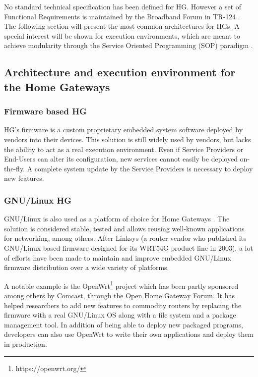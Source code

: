  
No standard technical specification has been defined for HG. However a set of Functional Requirements is maintained by the Broadband Forum in TR-124 \cite{broadband_forum_functional_2014}.
The following section will present the most common architectures for HGs.
A special interest will be shown for execution environments, which are meant to achieve modularity through the Service Oriented Programming (SOP) paradigm \cite{bieber2001introduction}.


\subsection{Architecture and execution environment for the Home Gateways}

\subsubsection{Firmware based HG}
HG's firmware is a custom proprietary embedded system software deployed by vendors into their devices.
This solution is still widely used by vendors, but lacks the ability to act as a real execution environment.
Even if Service Providers or End-Users can alter its configuration, new services cannot easily be deployed on-the-fly.
A complete system update by the Service Providers is necessary to deploy new features.
   
\subsubsection{GNU/Linux HG}
   
GNU/Linux is also used as a platform of choice for Home Gateways \cite{royon_multiservice_2007}.
The solution is considered stable, tested and allows reusing well-known applications for networking, among others.
After Linksys (a router vendor who published its GNU/Linux based firmware designed for its WRT54G product line in 2003), a lot of efforts have been made to maintain and improve embedded GNU/Linux firmware distribution over a wide variety of platforms.

A notable example is the OpenWrt\footnote{https://openwrt.org/} project which has been partly sponsored among others by Comcast, through the Open Home Gateway Forum.
It has helped researchers to add new features to commodity routers by replacing the firmware with a real GNU/Linux OS along with a file system and a package management tool.
In addition of being able to deploy new packaged programs, developers can also use OpenWrt to write their own applications and deploy them in production.


